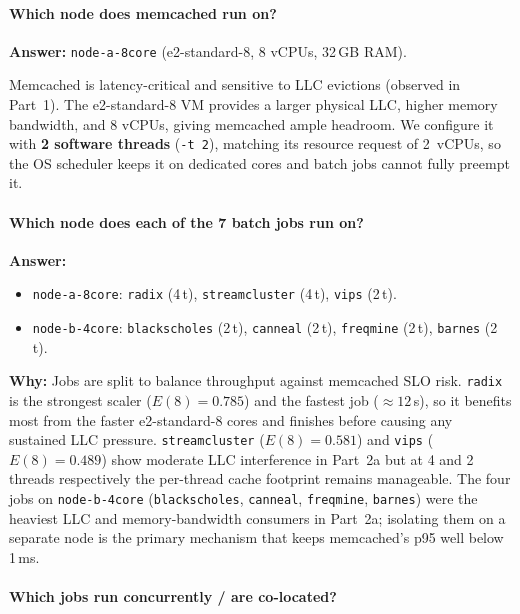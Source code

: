 \paragraph{Which node does memcached run on?}

\textbf{Answer:} \texttt{node-a-8core} (e2-standard-8, 8 vCPUs, 32\,GB RAM).

Memcached is latency-critical and sensitive to LLC evictions (observed in
Part~1).  The e2-standard-8 VM provides a larger physical LLC, higher memory
bandwidth, and 8 vCPUs, giving memcached ample headroom.
We configure it with \textbf{2 software threads} (\texttt{-t~2}), matching its
resource request of 2~vCPUs, so the OS scheduler keeps it on dedicated cores
and batch jobs cannot fully preempt it.

\paragraph{Which node does each of the 7 batch jobs run on?}

\textbf{Answer:}
\begin{itemize}
  \item \texttt{node-a-8core}: \texttt{radix} (4\,t), \texttt{streamcluster} (4\,t), \texttt{vips} (2\,t).
  \item \texttt{node-b-4core}: \texttt{blackscholes} (2\,t), \texttt{canneal} (2\,t), \texttt{freqmine} (2\,t), \texttt{barnes} (2\,t).
\end{itemize}

\textbf{Why:}
Jobs are split to balance throughput against memcached SLO risk.
\texttt{radix} is the strongest scaler ($E(8)=0.785$) and the fastest job
(${\approx}12$\,s), so it benefits most from the faster e2-standard-8 cores
and finishes before causing any sustained LLC pressure.
\texttt{streamcluster} ($E(8)=0.581$) and \texttt{vips} ($E(8)=0.489$)
show moderate LLC interference in Part~2a but at 4 and 2 threads
respectively the per-thread cache footprint remains manageable.
The four jobs on \texttt{node-b-4core}
(\texttt{blackscholes}, \texttt{canneal}, \texttt{freqmine}, \texttt{barnes})
were the heaviest LLC and memory-bandwidth consumers in Part~2a; isolating
them on a separate node is the primary mechanism that keeps memcached's
p95 well below 1\,ms.

\paragraph{Which jobs run concurrently / are co-located?}

